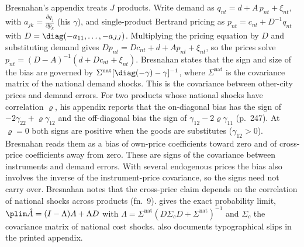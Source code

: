 Bresnahan's appendix treats $J$ products. Write demand as $q_{nt} = d + A\,p_{nt} + \xi_{nt}$, with
$a_{jk} = \frac{\partial q_j}{\partial p_k}$ (his $\gamma$), and single-product Bertrand pricing as
$p_{nt} = c_{nt} + D^{-1}q_{nt}$ with $D = \diag(-a_{11},\dots,-a_{JJ})$. Multiplying the pricing equation by
$D$ and substituting demand gives $Dp_{nt} = Dc_{nt} + d + Ap_{nt} + \xi_{nt}$, so the prices solve
$p_{nt} = (D - A)^{-1}(d + Dc_{nt} + \xi_{nt})$. Bresnahan states that the sign and size of the bias are
governed by $\Sigma^{\mathrm{nat}}[\diag(-\gamma) - \gamma]^{-1}$, where $\Sigma^{\mathrm{nat}}$ is the
covariance matrix of the national demand shocks. This is the covariance between other-city prices and demand
errors. For two products whose national shocks have correlation $\varrho$, his appendix reports that the
on-diagonal bias has the sign of $-2\gamma_{22} + \varrho\gamma_{12}$ and the off-diagonal bias the sign of
$\gamma_{12} - 2\varrho\gamma_{11}$ (p.~247). At $\varrho = 0$ both signs are positive when the goods are
substitutes ($\gamma_{12} > 0$). Bresnahan reads them as a bias of own-price coefficients toward zero and of
cross-price coefficients away from zero. These are signs of the covariance between instruments and demand
errors. With several endogenous prices the bias also involves the inverse of the instrument-price
covariance, so the signs need not carry over. Bresnahan notes that the cross-price claim depends on the
correlation of national shocks across products (fn.~9).  gives the exact probability
limit, $\plim\hat A = (I - \Lambda)A + \Lambda D$ with
$\Lambda = \Sigma^{\mathrm{nat}}(D\Sigma_cD + \Sigma^{\mathrm{nat}})^{-1}$ and $\Sigma_c$ the covariance matrix of
national cost shocks.  also documents typographical slips in the printed
appendix.

